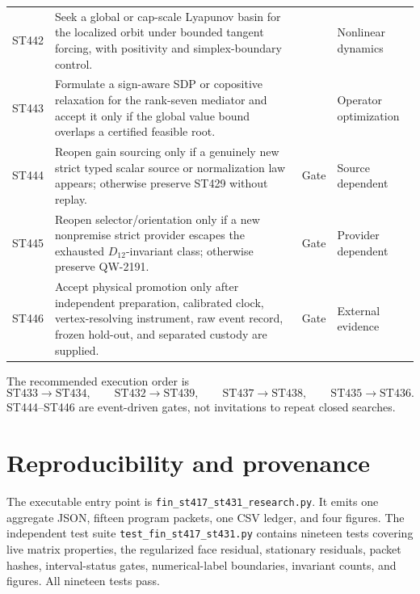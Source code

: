 \documentclass[11pt,a4paper]{article}
\begin{document}
\begin{longtable}{>{\raggedright\arraybackslash}p{}>{\raggedright\arraybackslash}p{}>{\raggedright\arraybackslash}p{}>{\raggedright\arraybackslash}p{}}
ST442&Seek a global or cap-scale Lyapunov basin for the localized orbit under bounded tangent forcing, with positivity and simplex-boundary control.&3&Nonlinear dynamics\\
ST443&Formulate a sign-aware SDP or copositive relaxation for the rank-seven mediator and accept it only if the global value bound overlaps a certified feasible root.&3&Operator optimization\\
ST444&Reopen gain sourcing only if a genuinely new strict typed scalar source or normalization law appears; otherwise preserve ST429 without replay.&Gate&Source dependent\\
ST445&Reopen selector/orientation only if a new nonpremise strict provider escapes the exhausted $D_{12}$-invariant class; otherwise preserve QW-2191.&Gate&Provider dependent\\
ST446&Accept physical promotion only after independent preparation, calibrated clock, vertex-resolving instrument, raw event record, frozen hold-out, and separated custody are supplied.&Gate&External evidence\\
\bottomrule
\end{longtable}

The recommended execution order is
\[
 \boxed{\text{ST433}\rightarrow\text{ST434},\qquad
        \text{ST432}\rightarrow\text{ST439},\qquad
        \text{ST437}\rightarrow\text{ST438},\qquad
        \text{ST435}\rightarrow\text{ST436}.}
\]
ST444--ST446 are event-driven gates, not invitations to repeat closed searches.

\section{Reproducibility and provenance}

The executable entry point is
\texttt{fin\_st417\_st431\_research.py}.  It emits one aggregate JSON, fifteen
program packets, one CSV ledger, and four figures.  The independent test suite
\texttt{test\_fin\_st417\_st431.py} contains nineteen tests covering live matrix
properties, the regularized face residual, stationary residuals, packet hashes,
interval-status gates, numerical-label boundaries, invariant counts, and figures.
All nineteen tests pass.
\end{document}

